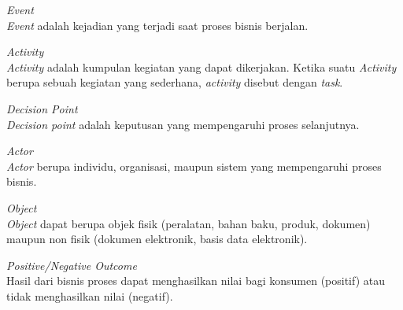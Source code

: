 \begin{description}
	\item{\textit{Event}} \hfill \\\textit{Event} adalah kejadian yang terjadi saat proses bisnis berjalan. 
	\item{\textit{Activity}} \hfill \\\textit{Activity} adalah kumpulan kegiatan yang dapat dikerjakan. Ketika suatu \textit{Activity} berupa sebuah kegiatan yang sederhana, \textit{activity} disebut dengan \textit{task}. 
	\item{\textit{Decision Point}} \hfill \\\textit{Decision point} adalah keputusan yang mempengaruhi proses selanjutnya.
	\item{\textit{Actor}} \hfill \\ \textit{Actor} berupa individu, organisasi, maupun sistem yang mempengaruhi proses bisnis. 
	\item{\textit{Object}} \hfill \\ \textit{Object} dapat berupa objek fisik (peralatan, bahan baku, produk, dokumen) maupun non fisik (dokumen elektronik, basis data elektronik).
	\item{\textit{Positive/Negative Outcome}} \hfill \\ Hasil dari bisnis proses dapat menghasilkan nilai bagi konsumen (positif) atau tidak menghasilkan nilai (negatif).
\end{description}




